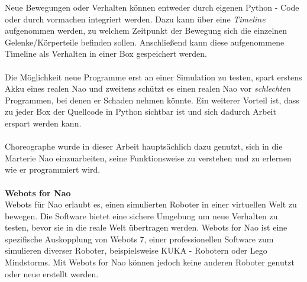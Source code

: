 Neue Bewegungen oder Verhalten können entweder durch eigenen Python - Code oder durch vormachen integriert werden. Dazu kann über eine \textit{Timeline} aufgenommen werden, zu welchem Zeitpunkt der Bewegung sich die einzelnen Gelenke/Körperteile befinden sollen. Anschließend kann diese aufgenommene Timeline als Verhalten in einer Box gespeichert werden.
\\
\\
Die Möglichkeit neue Programme erst an einer Simulation zu testen, spart erstens Akku eines realen Nao und zweitens schützt es einen realen Nao vor \textit{schlechten} Programmen, bei denen er Schaden nehmen könnte. Ein weiterer Vorteil ist, dass zu jeder Box der Quellcode in Python sichtbar ist und sich dadurch Arbeit erspart werden kann.
\\
\\
Choreographe wurde in dieser Arbeit hauptsächlich dazu genutzt, sich in die Marterie Nao einzuarbeiten, seine Funktionsweise zu verstehen und zu erlernen wie er programmiert wird.
\\
\\
\textbf{Webots for Nao}
\\
Webots für Nao erlaubt es, einen simulierten Roboter in einer virtuellen Welt zu bewegen. Die Software bietet eine sichere Umgebung um neue Verhalten zu testen, bevor sie in die reale Welt übertragen werden. Webots for Nao ist eine spezifische Auskopplung von Webots 7, einer professionellen Software zum simulieren diverser Roboter, beispielsweise KUKA - Robotern oder Lego Mindstorms. Mit Webots for Nao können jedoch keine anderen Roboter genutzt oder neue erstellt werden.

